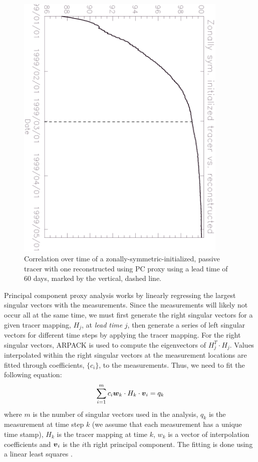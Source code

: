 \begin{figure}
\begin{center}
\includegraphics[angle=90, width=0.9\textwidth]{proxycorr.eps}
\caption{Correlation over time of a zonally-symmetric-initialized, passive tracer
with one reconstructed using PC proxy using a lead time of 60 days,
marked by the vertical, dashed line.}\label{PCproxytest}
\end{center}
\end{figure}

Principal component proxy analysis works by linearly regressing the
largest singular vectors with the measurements.
Since the measurements will likely not occur all at the same time,
we must first generate the right singular vectors for a given tracer 
mapping, $H_j$, at \textit{lead time} $j$, then generate a series of
left singular vectors for different time steps
by applying the tracer mapping.
For the right singular vectors, ARPACK is used to compute the
eigenvectors of $H_j^T\cdot H_j$.
Values interpolated within the right singular vectors at the 
measurement locations are fitted
through coefficients, $\lbrace c_i \rbrace$, to the measurements.
Thus, we need to fit the following equation:
\begin{equation}
\sum_{i=1}^m c_i \boldsymbol w_k \cdot H_k \cdot \boldsymbol v_i = q_k
\end{equation}
where $m$ is the number of singular vectors used in the analysis,
$q_k$ is the measurement at time step $k$ (we assume that each measurement
has a unique time stamp), $H_k$ is the tracer mapping at time $k$,
$w_k$ is a vector of interpolation coefficients and $\boldsymbol v_i$ is
the $i$th right principal component.
The fitting is done using a linear least squares \citep{gsl_ref}.

